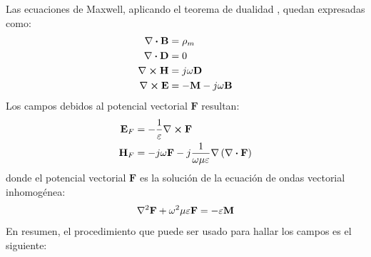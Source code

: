 Las ecuaciones de Maxwell, aplicando el teorema de dualidad \cite{Balanisantenas}, quedan expresadas como:
\begin{align}
\nabla\boldsymbol{\cdot}\mathbf{B} &= \rho_m
\label{ec_fundamentos:17}\\
\nabla\boldsymbol{\cdot}\mathbf{D} &= 0
\label{ec_fundamentos:18}\\
\nabla\boldsymbol{\times}\mathbf{H} &= j\omega\mathbf{D}
\label{ec_fundamentos:19}\\
\nabla\boldsymbol{\times}\mathbf{E} &= - \mathbf{M} - j\omega\mathbf{B}
\label{ec_fundamentos:20}
\end{align}
Los campos debidos al potencial vectorial $\mathbf{F}$ resultan:
\begin{align}
\mathbf{E}_F &= - \frac{1}{\varepsilon}\nabla\boldsymbol{\times}\mathbf{F}
\label{ec_fundamentos:21}\\
\mathbf{H}_F &= - j\omega\mathbf{F} - j\frac{1}{\omega\mu\varepsilon}\nabla\left(\nabla\boldsymbol{\cdot}\mathbf{F}\right)
\label{ec_fundamentos:22}
\end{align}
donde el potencial vectorial $\mathbf{F}$ es la solución de la ecuación de ondas vectorial inhomogénea:
\begin{align}
\nabla^2\mathbf{F} + \omega^2\mu\varepsilon\mathbf{F} = - \varepsilon\mathbf{M}
\label{ec_fundamentos:23}
\end{align}
En resumen, el procedimiento que puede ser usado para hallar los campos es el siguiente:

